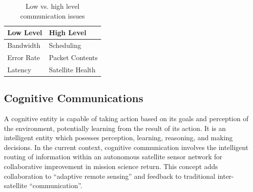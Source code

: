 \documentclass[conference]{IEEEtran}
\begin{document}

\begin{table}[t]
  \caption{Low vs. high level communication issues}
  \begin{center}
    \begin{tabular}{|l|l|}
      \hline
      \textbf{Low Level} & \textbf{High Level}\\
      \hline
      Bandwidth & Scheduling\\
      \hline
      Error Rate & Packet Contents\\
      \hline
      Latency & Satellite Health\\
      \hline
    \end{tabular}
    \label{tab:comms}
  \end{center}
\end{table}

\subsection{Cognitive Communications}
\label{ssec:cognit}

A cognitive entity is capable of taking action based on its goals and perception
of the environment, potentially learning from the result of its action.  It is
an intelligent entity which posesses perception, learning, reasoning, and making
decisions.  In the current context, cognitive communication involves the
intelligent routing of information within an autonomous satellite sensor network
for collaborative improvement in mission science return.  This concept adds
collaboration to ``adaptive remote sensing'' and feedback to traditional
inter-satellite ``communication''.
\end{document}
